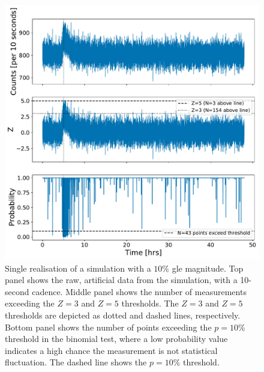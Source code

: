 \begin{figure}[ht!]
	\centering
	\includegraphics[width=0.9\columnwidth]{simulated_data_stats.pdf}
	\caption{Single realisation of a simulation with a $10\%$ \gls{gle} magnitude. Top panel shows the raw, artificial data from the simulation, with a 10-second cadence. Middle panel shows the number of measurements exceeding the $Z=3$ and $Z=5$ thresholds. The $Z=3$ and $Z=5$ thresholds are depicted as dotted and dashed lines, respectively. Bottom panel shows the number of points exceeding the $p = 10 \%$ threshold in the binomial test, where a low probability value indicates a high chance the measurement is not statistical fluctuation. The dashed line shows the $p = 10 \%$ threshold.}
	\label{fig:simulated_data_stats}
\end{figure}

\vspace{1em}

